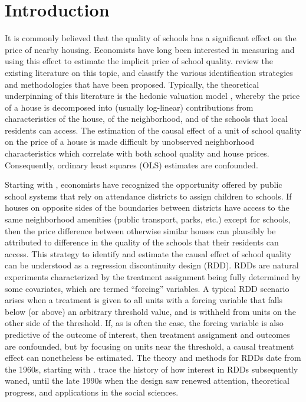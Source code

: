 \section{Introduction}\label{introduction}

It is commonly believed that the quality of schools has a significant effect on the price of nearby housing.
Economists have long been interested in measuring and using this effect to estimate the implicit price of school quality.
\cite{black2011housing} review the existing literature on this topic, and classify the various identification strategies and methodologies that have been proposed.
Typically, the theoretical underpinning of this literature is the hedonic valuation model \citep{rosen1974hedonic,sheppard1999hedonic}, whereby the price of a house is decomposed into (usually log-linear) contributions from characteristics of the house, of the neighborhood, and of the schools that local residents can access.
The estimation of the causal effect of a unit of school quality on the price of a house is made difficult by unobserved neighborhood characteristics which correlate with both school quality and house prices.
Consequently, ordinary least squares (OLS) estimates are confounded.

Starting with \citet{black1999better}, economists have recognized the opportunity offered by public school systems that rely on attendance districts to assign children to schools.
If houses on opposite sides of the boundaries between districts have access to the same neighborhood amenities (public transport, parks, etc.) except for schools, then the price difference between otherwise similar houses can plausibly be attributed to difference in the quality of the schools that their residents can access.
This strategy to identify and estimate the causal effect of school quality can be understood as a regression discontinuity design (RDD).
RDDs are natural experiments characterized by the treatment assignment being fully determined by some covariates, which are termed ``forcing'' variables.
A typical RDD scenario arises when a treatment is given to all units with a forcing variable that falls below (or above) an arbitrary threshold value, and is withheld from units on the other side of the threshold.
If, as is often the case, the forcing variable is also predictive of the outcome of interest, then treatment assignment and outcomes are confounded, but by focusing on units near the threshold, a causal treatment effect can nonetheless be estimated.
The theory and methods for RDDs date from the 1960s, starting with \cite{thistlethwaite1960regression}.
\cite{cook2008waiting} trace the history of how interest in RDDs subsequently waned, until the late 1990s when the design saw renewed attention, theoretical progress, and applications in the social sciences.

